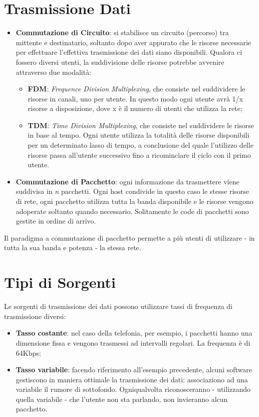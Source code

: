 \section{Trasmissione Dati}
\begin{itemize}
    \item \textbf{Commutazione di Circuito}: si stabilisce un circuito (percorso) tra mittente e destinatario, soltanto dopo aver appurato che le risorse necessarie per effettuare l'effettiva trasmissione dei dati siano disponibili.
    Qualora ci fossero diversi utenti, la suddivisione delle risorse potrebbe avvenire attraverso due modalità:
    \begin{itemize}
        \item \textbf{FDM}: \textit{Frequence Division Multiplexing}, che consiste nel suddividere le risorse in canali, uno per utente. In questo modo ogni utente avrà 1/x risorse a disposizione, dove x è il numero di utenti che utilizza la rete;
        \item \textbf{TDM}: \textit{Time Division Multiplexing}, che consiste nel suddividere le risorse in base al tempo. Ogni utente utilizza la totalità delle risorse disponibili per un determinato lasso di tempo, a conclusione del quale l'utilizzo delle risorse passa all'utente successivo fino a ricominciare il ciclo con il primo utente.
    \end{itemize}
    
    \item \textbf{Commutazione di Pacchetto}: ogni informazione da trasmettere viene suddivisa in \textit{n} pacchetti. Ogni host condivide in questo caso le stesse risorse di rete, ogni pacchetto utilizza tutta la banda disponibile e le risorse vengono adoperate soltanto quando necessario.
    Solitamente le code di pacchetti sono gestite in ordine di arrivo.
\end{itemize}
Il paradigma a commutazione di pacchetto permette a più utenti di utilizzare - in tutta la sua banda e potenza - la stessa rete.

\section{Tipi di Sorgenti}
Le sorgenti di trasmissione dei dati possono utilizzare tassi di frequenza di trasmissione diversi:
\begin{itemize}
    \item \textbf{Tasso costante}: nel caso della telefonia, per esempio, i pacchetti hanno una dimensione fissa e vengono trasmessi ad intervalli regolari. La frequenza è di 64Kbps;
    \item \textbf{Tasso variabile}: facendo riferimento all'esempio precedente, alcuni software gestiscono in maniera ottimale la trasmissione dei dati: associaziono ad una variabile il rumore di sottofondo. Ogniqualvolta riconosceranno - utilizzando quella variabile - che l'utente non sta parlando, non invieranno alcun pacchetto.
\end{itemize}
